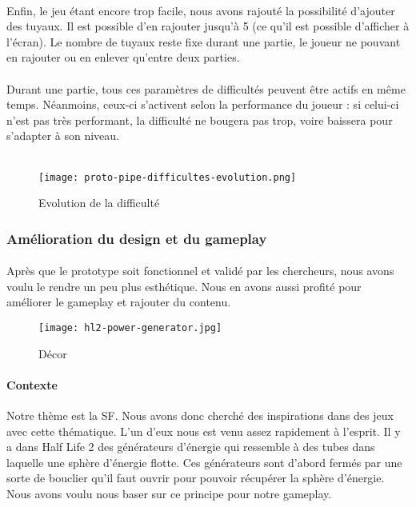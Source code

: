 \paragraph{}Enfin, le jeu étant encore trop facile, nous avons rajouté la possibilité d'ajouter des tuyaux. Il est possible d'en rajouter jusqu'à 5 (ce qu'il est possible d'afficher à l'écran). Le
nombre de tuyaux reste fixe durant une partie, le joueur ne pouvant en rajouter ou en enlever qu'entre deux parties.

\paragraph{}Durant une partie, tous ces paramètres de difficultés peuvent être actifs en même temps. Néanmoins, ceux-ci s'activent selon la performance du joueur : si celui-ci n'est pas très
performant, la difficulté ne bougera pas trop, voire baissera pour s'adapter à son niveau. \\ \\

\begin{figure}[H]
    \begin{center}
    \texttt{[image: proto-pipe-difficultes-evolution.png]}
    \end{center}
    \caption{Evolution de la difficulté}
\label{ProtoPipeDifficultes}
\end{figure}

\newpage
\subsubsection{Amélioration du design et du gameplay}

\paragraph{}Après que le prototype soit fonctionnel et validé par les chercheurs, nous avons voulu le rendre un peu plus esthétique. Nous en avons aussi profité pour améliorer le
gameplay et rajouter du contenu. \\


\begin{wrapfigure}[13]{l}{6cm}
    \vspace{-10pt}
    \texttt{[image: hl2-power-generator.jpg]}
    \captionsetup{labelformat=simpleNumber}
    \caption{Décor}
\end{wrapfigure}

\paragraph{Contexte}Notre thème est la \gls{SF}. Nous avons donc cherché des inspirations dans des jeux avec cette thématique. L'un d'eux nous est venu assez rapidement à l'esprit.
Il y a dans Half Life 2 des générateurs d'énergie qui ressemble à des tubes dans laquelle une sphère d'énergie flotte. Ces générateurs sont d'abord fermés par une sorte de bouclier
qu'il faut ouvrir pour pouvoir récupérer la sphère d'énergie. Nous avons voulu nous baser sur ce principe pour notre gameplay.

